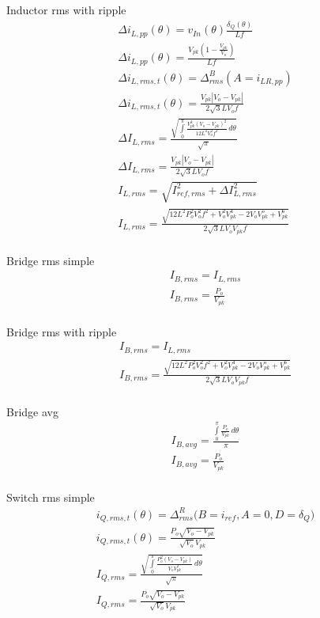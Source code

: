 \documentclass[12pt]{report}
\begin{document}
Inductor rms with ripple
\begin{align}
\Delta i_{L,pp}(\theta) = v_{In}(\theta)\frac{\delta_{Q}(\theta)}{Lf}\\
\Delta i_{L,pp}(\theta) = \frac{V_{pk} \left(1 - \frac{V_{pk}}{V_{o}}\right)}{L f}\\
\Delta i_{L,rms,t}(\theta) = \Delta^B_{rms}(A=i_{LR,pp})\\
\Delta i_{L,rms,t}(\theta) = \frac{V_{pk} \left|{V_{o} - V_{pk}}\right|}{2 \sqrt{3} L V_{o} f}\\
\Delta I_{L,rms} = \frac{\sqrt{\int\limits_{0}^{\pi} \frac{V_{pk}^{2} \left(V_{o} - V_{pk}\right)^{2}}{12 L^{2} V_{o}^{2} f^{2}}\, d\theta}}{\sqrt{\pi}}\\
\Delta I_{L,rms} = \frac{V_{pk} \left|{V_{o} - V_{pk}}\right|}{2 \sqrt{3} L V_{o} f}\\
I_{L,rms} = \sqrt{I_{ref,rms}^2 + \Delta I_{L,rms}^2}\\
I_{L,rms} = \frac{\sqrt{12 L^{2} P_{o}^{2} V_{o}^{2} f^{2} + V_{o}^{2} V_{pk}^{4} - 2 V_{o} V_{pk}^{5} + V_{pk}^{6}}}{2 \sqrt{3} L V_{o} V_{pk} f}\\
\end{align}

Bridge rms simple
\begin{align}
I_{B,rms} = I_{L,rms}\\
I_{B,rms} = \frac{P_{o}}{V_{pk}}\\
\end{align}

Bridge rms with ripple
\begin{align}
I_{B,rms} = I_{L,rms}\\
I_{B,rms} = \frac{\sqrt{12 L^{2} P_{o}^{2} V_{o}^{2} f^{2} + V_{o}^{2} V_{pk}^{4} - 2 V_{o} V_{pk}^{5} + V_{pk}^{6}}}{2 \sqrt{3} L V_{o} V_{pk} f}\\
\end{align}

Bridge avg
\begin{align}
I_{B,avg} = \frac{\int\limits_{0}^{\pi} \frac{P_{o}}{V_{pk}}\, d\theta}{\pi}\\
I_{B,avg} = \frac{P_{o}}{V_{pk}}\\
\end{align}

Switch rms simple
\begin{align}
i_{Q,rms,t}(\theta) = \Delta^R_{rms} \big(B=i_{ref}, A=0, D=\delta_{Q} \big)\\
i_{Q,rms,t}(\theta) = \frac{P_{o} \sqrt{V_{o} - V_{pk}}}{\sqrt{V_{o}} V_{pk}}\\
I_{Q,rms} = \frac{\sqrt{\int\limits_{0}^{\pi} \frac{P_{o}^{2} \left(V_{o} - V_{pk}\right)}{V_{o} V_{pk}^{2}}\, d\theta}}{\sqrt{\pi}}\\
I_{Q,rms} = \frac{P_{o} \sqrt{V_{o} - V_{pk}}}{\sqrt{V_{o}} V_{pk}}\\
\end{align}
\end{document}
